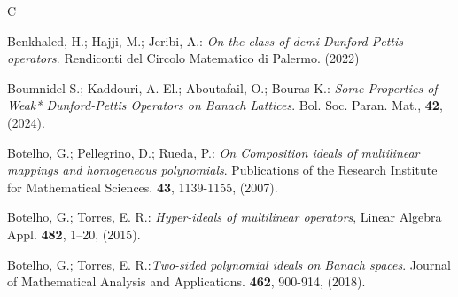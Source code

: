 \documentclass[12 pt]{article}%
\newtheorem{final remark}[theorem]{Final Remark}
\begin{document}
\begin{thebibliography}{C}
	
	 Benkhaled, H.; Hajji, M.; Jeribi, A.: {\it On the class of demi Dunford-Pettis operators}. Rendiconti del Circolo Matematico di Palermo. (2022)
	
	 Boumnidel S.; Kaddouri, A. El.; Aboutafail, O.; Bouras K.: {\it Some Properties of Weak* Dunford-Pettis Operators on Banach Lattices}. Bol. Soc. Paran. Mat., {\bf 42}, (2024).
	
	
	
	
	 Botelho, G.; Pellegrino, D.; Rueda, P.:
	{\it On Composition ideals of multilinear mappings and homogeneous polynomials}. Publications of the Research Institute for Mathematical Sciences.  {\bf 43}, 1139-1155, (2007).
	
	 Botelho, G.;  Torres, E. R.: {\it Hyper-ideals of multilinear operators}, Linear Algebra Appl. {\bf 482}, 1--20, (2015).
	
	
	 Botelho, G.; Torres, E. R.:{\it Two-sided polynomial ideals on Banach spaces}. Journal of Mathematical Analysis and Applications. {\bf 462}, 900-914, (2018).
	
	
	
	
	

\end{thebibliography}
\end{document}
